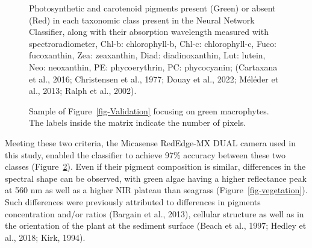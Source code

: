 \documentclass[
  letterpaper,
  11pt,
  english,
  singlespacing,
  headsepline]{MastersDoctoralThesis}
\begin{document}
\begin{spacing}{1.5}
\begin{figure}
{}

\caption{\label{fig-Pigm}Photosynthetic and carotenoid pigments present
(Green) or absent (Red) in each taxonomic class present in the Neural
Network Classifier, along with their absorption wavelength measured with
spectroradiometer, Chl-b: chlorophyll-b, Chl-c: chlorophyll-c, Fuco:
fucoxanthin, Zea: zeaxanthin, Diad: diadinoxanthin, Lut: lutein, Neo:
neoxanthin, PE: phycoerythrin, PC: phycocyanin; (Cartaxana et al., 2016;
Christensen et al., 1977; Douay et al., 2022; Méléder et al., 2013;
Ralph et al., 2002).}

\end{figure}%

\begin{figure}


\caption{\label{fig-ValidationGreen}Sample of
Figure~\ref{fig-Validation} focusing on green macrophytes. The labels
inside the matrix indicate the number of pixels.}

\end{figure}%

Meeting these two criteria, the Micasense RedEdge-MX DUAL camera used in
this study, enabled the classifier to achieve 97\% accuracy between
these two classes (Figure~\ref{fig-ValidationGreen}). Even if their
pigment composition is similar, differences in the spectral shape can be
observed, with green algae having a higher reflectance peak at 560 nm as
well as a higher NIR plateau than seagrass
(Figure~\ref{fig-vegetation}). Such differences were previously
attributed to differences in pigments concentration and/or ratios
(Bargain et al., 2013), cellular structure as well as in the orientation
of the plant at the sediment surface (Beach et al., 1997; Hedley et al.,
2018; Kirk, 1994).


\end{spacing}
\end{document}

